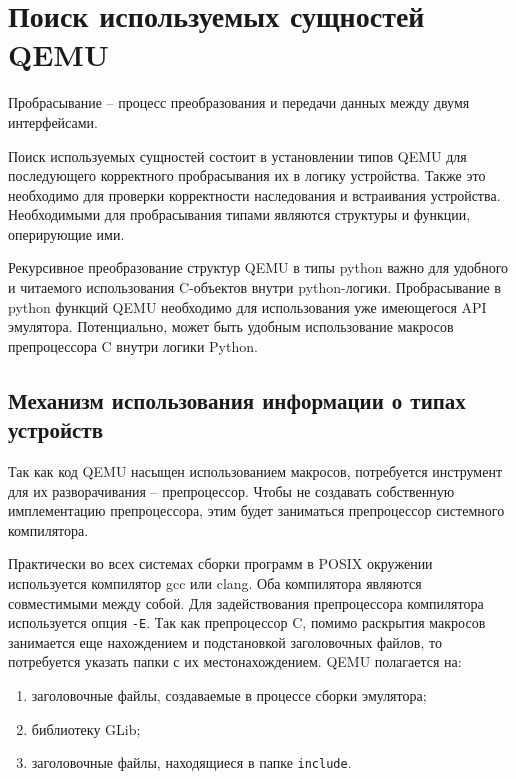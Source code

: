 \section{Поиск используемых сущностей QEMU}\label{sec:ch2/sec2}

Пробрасывание -- процесс преобразования и передачи данных между двумя интерфейсами.

Поиск используемых сущностей состоит в установлении типов QEMU для последующего
корректного пробрасывания их в логику устройства.
Также это необходимо для проверки корректности наследования и встраивания устройства.
Необходимыми для пробрасывания типами являются структуры и функции, оперирующие ими.

Рекурсивное преобразование структур QEMU в типы python важно для удобного и читаемого
использования C-объектов внутри python-логики.
Пробрасывание в python функций QEMU необходимо для использования уже имеющегося API эмулятора.
Потенциально, может быть удобным использование макросов препроцессора C внутри
логики Python.


\subsection{Механизм использования информации о типах устройств}\label{sec:ch2/sec2/sub2/sub2}

Так как код QEMU насыщен использованием макросов, потребуется инструмент для их разворачивания -- препроцессор.
Чтобы не создавать собственную имплементацию препроцессора, этим будет заниматься препроцессор системного компилятора.

Практически во всех системах сборки программ в POSIX \cite{posix} окружении используется компилятор gcc или clang.
Оба компилятора являются совместимыми между собой. Для задействования препроцессора компилятора используется
опция \texttt{-E}. Так как препроцессор C, помимо раскрытия макросов занимается еще нахождением и подстановкой
заголовочных файлов, то потребуется указать папки с их местонахождением.
QEMU полагается на:
\begin{enumerate}[label={\arabic*)}]
    \item \label{build-header} заголовочные файлы, создаваемые в процессе сборки эмулятора;
    \item библиотеку GLib;
    \item заголовочные файлы, находящиеся в папке \texttt{include}.
\end{enumerate}

